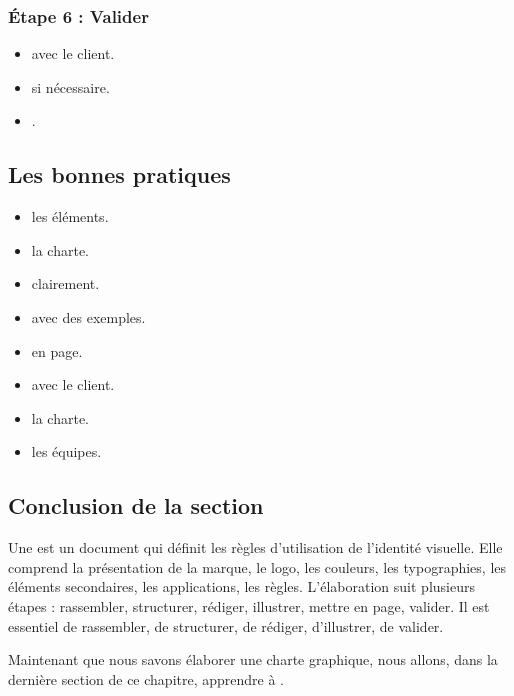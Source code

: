 \subsubsection{Étape 6 : Valider}

\begin{itemize}
    \item {} avec le client.
    \item {} si nécessaire.
    \item {}.
\end{itemize}

\subsection{Les bonnes pratiques}

\begin{itemize}
    \item {} les éléments.
    \item {} la charte.
    \item {} clairement.
    \item {} avec des exemples.
    \item {} en page.
    \item {} avec le client.
    \item {} la charte.
    \item {} les équipes.
\end{itemize}

\subsection*{Conclusion de la section}

Une  est un document qui définit les règles d'utilisation de l'identité visuelle. Elle comprend la présentation de la marque, le logo, les couleurs, les typographies, les éléments secondaires, les applications, les règles. L'élaboration suit plusieurs étapes : rassembler, structurer, rédiger, illustrer, mettre en page, valider. Il est essentiel de rassembler, de structurer, de rédiger, d'illustrer, de valider.

Maintenant que nous savons élaborer une charte graphique, nous allons, dans la dernière section de ce chapitre, apprendre à .

